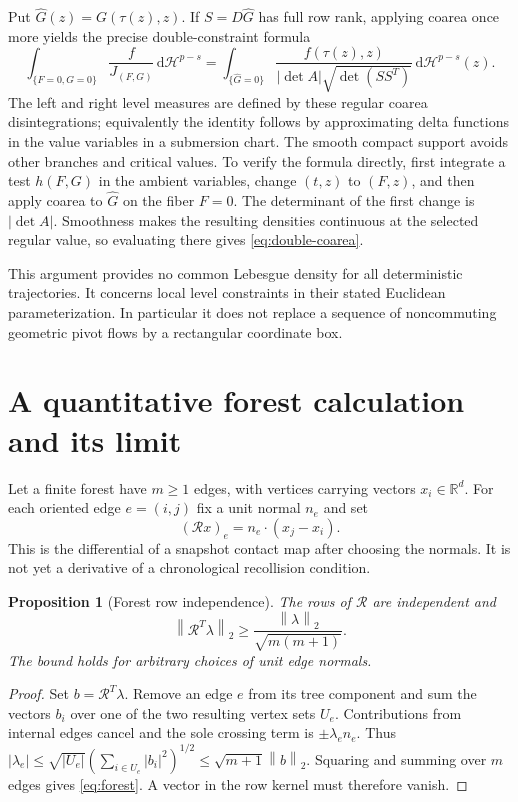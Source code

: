 \documentclass[11pt,reqno]{amsart}
\numberwithin{equation}{section}
\newtheorem{proposition}[theorem]{Proposition}
\theoremstyle{remark}\newtheorem{remark}[theorem]{Remark}
\newcommand{\R}{\mathbb R}\newcommand{\dd}{\,\mathrm d}
\newcommand{\norm}[1]{\left\lVert #1\right\rVert}
\begin{document}
Put $\widehat G(z)=G(\tau(z),z)$. If $S=D\widehat G$ has full row rank, applying coarea once more yields the precise double-constraint formula
\begin{equation}\label{eq:double-coarea}
 \int_{\{F=0,G=0\}}\frac{f}{J_{(F,G)}}\dd\mathcal H^{p-s}
 =\int_{\{\widehat G=0\}}
 \frac{f(\tau(z),z)}{|\det A|\sqrt{\det(SS^T)}}\dd\mathcal H^{p-s}(z).
\end{equation}
The left and right level measures are defined by these regular coarea disintegrations; equivalently the identity follows by approximating delta functions in the value variables in a submersion chart. The smooth compact support avoids other branches and critical values. To verify the formula directly, first integrate a test $h(F,G)$ in the ambient variables, change $(t,z)$ to $(F,z)$, and then apply coarea to $\widehat G$ on the fiber $F=0$. The determinant of the first change is $|\det A|$. Smoothness makes the resulting densities continuous at the selected regular value, so evaluating there gives \eqref{eq:double-coarea}.

This argument provides no common Lebesgue density for all deterministic trajectories. It concerns local level constraints in their stated Euclidean parameterization. In particular it does not replace a sequence of noncommuting geometric pivot flows by a rectangular coordinate box.

\section{A quantitative forest calculation and its limit}
Let a finite forest have $m\ge1$ edges, with vertices carrying vectors $x_i\in\R^d$. For each oriented edge $e=(i,j)$ fix a unit normal $n_e$ and set
\[
 (\mathcal R x)_e=n_e\cdot(x_j-x_i).
\]
This is the differential of a snapshot contact map after choosing the normals. It is not yet a derivative of a chronological recollision condition.
\begin{proposition}[Forest row independence]\label{prop:forest}
The rows of $\mathcal R$ are independent and
\begin{equation}\label{eq:forest}
 \norm{\mathcal R^T\lambda}_2\ge\frac{\norm\lambda_2}{\sqrt{m(m+1)}}.
\end{equation}
The bound holds for arbitrary choices of unit edge normals.
\end{proposition}
\begin{proof}
Set $b=\mathcal R^T\lambda$. Remove an edge $e$ from its tree component and sum the vectors $b_i$ over one of the two resulting vertex sets $U_e$. Contributions from internal edges cancel and the sole crossing term is $\pm\lambda_e n_e$. Thus
$|\lambda_e|\le\sqrt{|U_e|}(\sum_{i\in U_e}|b_i|^2)^{1/2}\le\sqrt{m+1}\norm b_2$.
Squaring and summing over $m$ edges gives \eqref{eq:forest}. A vector in the row kernel must therefore vanish.
\end{proof}
\end{document}
